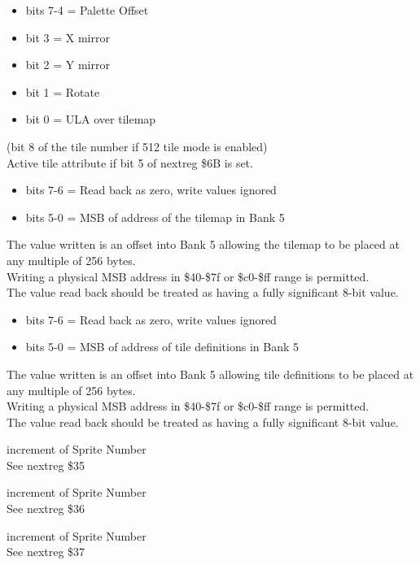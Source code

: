 \begin{itemize}
\item bits 7-4 = Palette Offset
\item bit 3 = X mirror
\item bit 2 = Y mirror
\item bit 1 = Rotate
\item bit 0 = ULA over tilemap
\end{itemize}
(bit 8 of the tile number if 512 tile mode is enabled)\\
Active tile attribute if bit 5 of nextreg \$6B is set.

\begin{itemize}
\item bits 7-6 = Read back as zero, write values ignored
\item bits 5-0 = MSB of address of the tilemap in Bank 5
\end{itemize}
The value written is an offset into Bank 5 allowing the tilemap to be
placed at any multiple of 256 bytes.\\
Writing a physical MSB address in \$40-\$7f or \$c0-\$ff range is
permitted.\\
The value read back should be treated as having a fully significant
8-bit value.

\begin{itemize}
\item bits 7-6 = Read back as zero, write values ignored
\item bits 5-0 = MSB of address of tile definitions in Bank 5
\end{itemize}
The value written is an offset into Bank 5 allowing tile definitions
to be placed at any multiple of 256 bytes.\\
Writing a physical MSB address in \$40-\$7f or \$c0-\$ff range is
permitted.\\
The value read back should be treated as having a fully significant
8-bit value.

increment of Sprite Number\\
See nextreg \$35

increment of Sprite Number\\
See nextreg \$36

increment of Sprite Number\\
See nextreg \$37

